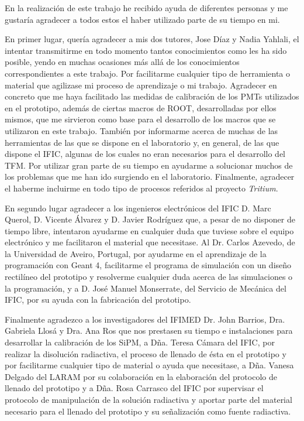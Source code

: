 En la realización de este trabajo he recibido ayuda de diferentes personas y me gustaría agradecer a todos estos el haber utilizado parte de su tiempo en mi.

En primer lugar, quería agradecer a mis dos tutores, Jose Díaz y Nadia Yahlali, el intentar transmitirme en todo momento tantos conocimientos como les ha sido posible, yendo en muchas ocasiones más allá de los conocimientos correspondientes a este trabajo. Por facilitarme cualquier tipo de herramienta o material que agilizase mi proceso de aprendizaje o mi trabajo. Agradecer en concreto que me haya facilitado las medidas de calibración de los PMTs utilizados en el prototipo, además de ciertas macros de ROOT, desarrolladas por ellos mismos, que me sirvieron como base para el desarrollo de los macros que se utilizaron en este trabajo. También por informarme acerca de muchas de las herramientas de las que se dispone en el laboratorio y, en general, de las que dispone el IFIC, algunas de los cuales no eran necesarios para el desarrollo del TFM. Por utilizar gran parte de su tiempo en ayudarme a solucionar muchos de los problemas que me han ido surgiendo en el laboratorio. Finalmente, agradecer el haberme incluirme en todo tipo de procesos referidos al proyecto \textit{Tritium}. 



En segundo lugar agradecer a los ingenieros electrónicos  del IFIC D. Marc Querol, D. Vicente Álvarez  y D. Javier Rodríguez que, a pesar de no disponer de tiempo libre, intentaron ayudarme en cualquier duda que tuviese sobre el equipo electrónico y me  facilitaron el material que necesitase.  Al Dr.  Carlos Azevedo, de la Universidad de Aveiro, Portugal, por ayudarme en el aprendizaje de la programación con Geant 4, facilitarme el programa de simulación con un diseño rectilíneo del prototipo y resolverme cualquier duda acerca de las simulaciones o la programación, y a  D.  José Manuel Monserrate, del Servicio de Mecánica del IFIC, por su ayuda con la fabricación del prototipo.

Finalmente agradezco a los investigadores del IFIMED  Dr. John Barrios, Dra. Gabriela Llosá y Dra. Ana Ros que nos prestasen su tiempo e instalaciones para desarrollar la calibración de los SiPM, a  Dña. Teresa Cámara del IFIC,  por realizar la disolución radiactiva, el proceso de llenado de ésta en el prototipo y por facilitarme cualquier tipo de material o ayuda que necesitase, a Dña. Vanesa Delgado  del LARAM por su colaboración en la elaboración del protocolo de llenado del prototipo y  a Dña. Rosa Carrasco del IFIC por supervisar el protocolo de manipulación de la solución radiactiva y aportar parte del material necesario para el llenado del prototipo y su señalización como fuente radiactiva.